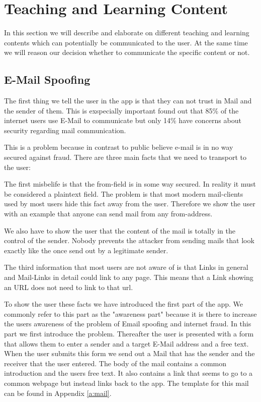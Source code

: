 \section{Teaching and Learning Content}

In this section we will describe and elaborate on different teaching and learning contents which can potentially be communicated to the user.
 At the same time we will reason our decision whether to communicate the specific content or not.

\subsection{E-Mail Spoofing}
The first thing we tell the user in the app is that they can not trust in Mail and the sender of them.
This is exspecially important \cite{divsi2012divsi} found out that 85\% of the internet users use E-Mail to communicate but only 14\% have concerns about security regarding mail communication.

This is a problem because in contrast to public believe e-mail is in no way secured against fraud. There are three main facts that we need to transport to the user:
\begin{description}[leftmargin=0cm]
	\item[From Field] The first misbelife is that the from-field is in some way secured.
	In reality it must be considered a plaintext field.
	The problem is that most modern mail-clients used by most users hide this fact away from the user.
	Therefore we show the user with an example that anyone can send mail from any from-address.
	\item[E-Mail Content] We also have to show the user that the content of the mail is totally in the control of the sender.
	Nobody prevents the attacker from sending mails that look exactly like the once send out by a legitimate sender.
	\item[Links in E-Mails] The third information that most users are not aware of is that Links in general and Mail-Links in detail could link to any page. This means that a Link showing an URL does not need to link to that url.
\end{description}
To show the user these facts we have introduced the first part of the app.
We commonly refer to this part as the "awareness part" because it is there to increase the users awareness of the problem of Email spoofing and internet fraud.
In this part we first introduce the problem.
Thereafter the user is presented with a form that allows them to enter a sender and a target E-Mail address and a free text.
When the user submits this form we send out a Mail that has the sender and the receiver that the user entered.
The body of the mail contains a common introduction and the users free text.
It also contains a link that seems to go to a common webpage but instead links back to the app.
The template for this mail can be found in Appendix \autoref{a:mail}.

